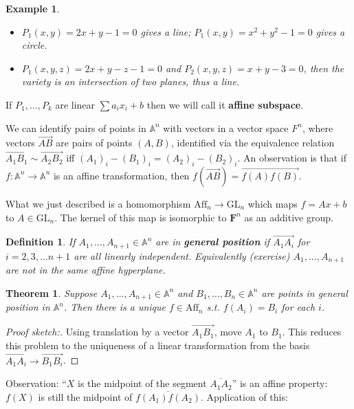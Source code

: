 \documentclass[12pt]{article}
\newcommand{\F}{\mathbf{F}}
\newcommand{\GL}{\mathrm{GL}}
\newcommand{\A}{\mathbb{A}}
\newcommand{\Aff}{\mathrm{Aff}}
\newtheorem{definition}{Definition}
\newtheorem{example}[]{Example}
\newtheorem{theorem}{Theorem}
\begin{document}
    \begin{example}
        \begin{itemize}
            \item $P_1(x, y) = 2x + y - 1 = 0$ gives a line; $P_1(x, y) = x^2 + y^2 - 1 = 0$ gives a circle.
            \item $P_1(x, y, z) = 2x+y-z-1 = 0$ and $P_2(x, y, z) = x + y -3 = 0$, then the variety is an intersection of two planes, thus a line.  
        \end{itemize}
    \end{example}
    If $P_1, \dots, P_k$ are linear $\sum a_i x_i + b$ then we will call it \textbf{affine subspace}.\par 
    We can identify pairs of points in $\A^n$ with vectors in a vector space $F^n$, where vectors $\overrightarrow{AB}$ are pairs of points $(A, B)$, identified via the equivalence relation $\overrightarrow{A_1B_1} \sim \overrightarrow{A_2B_2}$ iff $(A_1)_i - (B_1)_i = (A_2)_i - (B_2)_i$. An observation is that if $f: \A^n \to \A^n$ is an affine transformation, then $f(\overrightarrow{AB}) = \overrightarrow{f(A)f(B)}$. \par 
    What we just described is a homomorphism $\mathrm{Aff}_n \to \GL_n$ which maps $f = Ax + b$ to $A \in \GL_n$. The kernel of this map is isomorphic to $\F^n$ as an additive group. \par 
    \begin{definition}
        If $A_1, \dots, A_{n+1} \in \A^n$ are in \textbf{general position} if $\overrightarrow{A_1A_i}$ for $i = 2, 3, \dots n+1$ are all linearly independent. Equivalently (exercise) $A_1, \dots, A_{n+1}$ are not in the same affine hyperplane. 
    \end{definition}
    \begin{theorem}
        Suppose $A_1, \dots, A_{n+1} \in \A^n$ and $B_1, \dots, B_n \in \A^n$ are points in general position in $\A^n$. Then there is a unique $f \in \Aff_n$ s.t. $f(A_i) = B_i$ for each $i$.  
    \end{theorem}
    \begin{proof}
        [Proof sketch:] Using translation by a vector $\overrightarrow{A_1B_1}$, move $A_1$ to $B_1$. This reduces this problem to the uniqueness of a linear transformation from the basis $\overrightarrow{A_1A_i} \to \overrightarrow{B_1B_i}$. 
    \end{proof}
    Observation: ``$X$ is the midpoint of the segment $\overline{A_1A_2}$'' is an affine property: $f(X)$ is still the midpoint of $\overline{f(A_1)f(A_2)}$. Application of this: 
\end{document}
